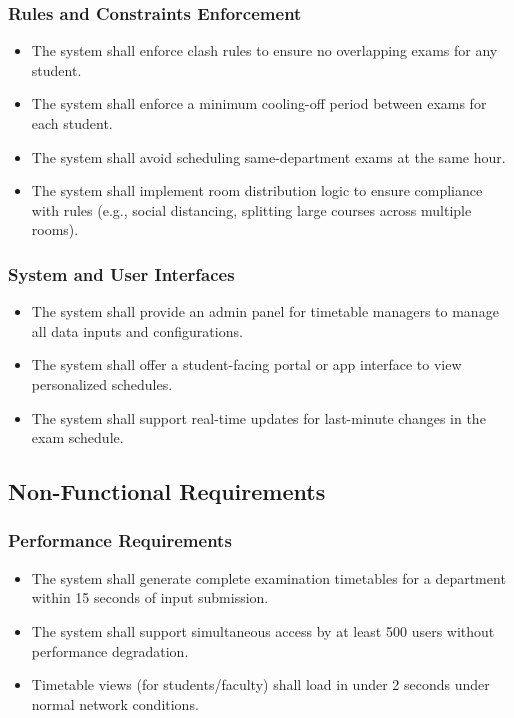 \documentclass[a4paper,12pt]{article}
\begin{document}
\subsubsection{Rules and Constraints Enforcement}
\begin{itemize}
\item The system shall enforce clash rules to ensure no overlapping exams for any student.

\item The system shall enforce a minimum cooling-off period between exams for each student.

\item The system shall avoid scheduling same-department exams at the same hour.

\item The system shall implement room distribution logic to ensure compliance with rules (e.g., social distancing, splitting large courses across multiple rooms).
\end{itemize}

\subsubsection{System and User Interfaces}
\begin{itemize}
\item The system shall provide an admin panel for timetable managers to manage all data inputs and configurations.

\item The system shall offer a student-facing portal or app interface to view personalized schedules.

\item The system shall support real-time updates for last-minute changes in the exam schedule.
\end{itemize}




\subsection{Non-Functional Requirements}
\subsubsection{Performance Requirements}
\begin{itemize}
\item The system shall generate complete examination timetables for a department within 15 seconds of input submission.

\item The system shall support simultaneous access by at least 500 users without performance degradation.

\item Timetable views (for students/faculty) shall load in under 2 seconds under normal network conditions.
\end{itemize}
\end{document}
